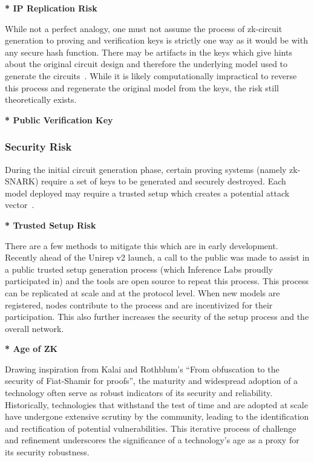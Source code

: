 \documentclass[conference]{IEEEtran}
\begin{document}
\textbf{* IP Replication Risk}

While not a perfect analogy, one must not assume the process of zk-circuit generation to proving and veriﬁcation keys is strictly one way as it would be with any secure hash function. There may be artifacts in the keys which give hints about the original circuit design and therefore the underlying model used to generate the circuits~\cite{BenSasson2014SuccinctNZ}. While it is likely computationally impractical to reverse this process and regenerate the original model from the keys, the risk still theoretically exists.

\textbf{* Public Veriﬁcation Key}

\subsubsection{Security Risk}

During the initial circuit generation phase, certain proving systems (namely zk-SNARK) require a set of keys to be generated and securely destroyed. Each model deployed may require a trusted setup which creates a potential attack vector~\cite{Bowe2017ScalableMC}.

\textbf{* Trusted Setup Risk}

There are a few methods to mitigate this which are in early development. Recently ahead of the Unirep v2 launch, a call to the public was made to assist in a public trusted setup generation process (which Inference Labs proudly participated in) and the tools are open source to repeat this process. This process can be replicated at scale and at the protocol level. When new models are registered, nodes contribute to the process and are incentivized for their participation. This also further increases the security of the setup process and the overall network.


\textbf{* Age of ZK}

Drawing inspiration from Kalai and Rothblum’s “From obfuscation to the security of Fiat-Shamir for proofs”, the maturity and widespread adoption of a technology often serve as robust indicators of its security and reliability. Historically, technologies that withstand the test of time and are adopted at scale have undergone extensive scrutiny by the community, leading to the identiﬁcation and rectiﬁcation of potential vulnerabilities. This iterative process of challenge and reﬁnement underscores the signiﬁcance of a technology’s age as a proxy for its security robustness.
\end{document}
